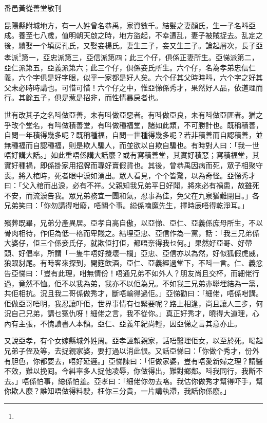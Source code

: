 \documentclass[a5paper, 12pt, openany]{book} %
\begin{document}
	番邑黃從善堂敬刊

	昆陽縣附城地方，有一人姓曾名恭禹，家資數千。結髮之妻顏氏，生一子名呌亞成。養至七八歲，值明朝天啟之時，地方盜起，不幸遭乱，妻子被賊捉去。乱定之後，續娶一个填房孔氏，又娶妾楊氏。妻生三子，妾又生三子。論起層次，長子亞孝派\footnote{}第一，亞忠派第三，亞信派第四；此三个仔，俱係正妻所生。亞悌派第二，亞仁派第五，亞義派第六；此三个仔，俱係妾氏所生。六个仔，名為孝弟忠信仁義，六个字俱是好字眼，似乎一家都是好人矣。六个仔其父時時呌，六个字之好其父未必時時講也。可惜可惜！六个仔之中，惟亞悌係秀才，果然好人品，依道理而行。其餘五子，俱是惹是招非，而性情暴戾者也。

	世有改其子之名呌做亞善，未有呌做亞惡者。有呌做亞良，未有呌做亞匪者。猶之乎改个堂名，有呌做積善堂，有呌做種福堂，諸如此類，不可勝計也。既稱積善，自問一年積得幾多呢？既稱種福，自問一世種得幾多呢？若非積善而自認積善，並無種福而自認種福，則是欺人騙人，而並欲以自欺自騙也。有時對人曰：「我一世唔好講大話。」如此重唔係講大話麼？或有寫積善堂，其實好積惡；寫積福堂，其實好種禍，即係掛家用招牌而專好賣假貨也。其後，曾恭禹因病而死，眾子相聚守喪。將入棺時，死者眼中淚如湧出。眾人看見，个个皆驚，以為奇怪。亞悌秀才曰：「父入棺而出淚，必有不祥。父親知我兄弟平日好鬦，將來必有禍患，故雖死不安，而流淚告我。眾兄弟務宜一團和氣，忍事為佳，免父在九泉猶難閉目。」各兄弟笑曰：「你勿講得咁廢，唔關个事。縂係喃魔先生，擇時辰唔得乾淨耳。」

	殯葬既畢，兄弟分產異居。亞孝自高自傲，以亞悌、亞仁、亞義係庶母所生，不以骨肉相待，作佢為低一格而卑賤之。結埋亞忠、亞信作為一黨，話：「我三兄弟係大婆仔，佢三个係妾氏仔，就欺佢打佢，都唔奈得我乜何。」果然好亞哥、好帶頭、好倡率，所謂「一隻牛唔好攪壞一欄」亞忠、亞信亦以為然，好似狐假虎威，狼跟豺尾。有時客來探到，開筵飲酒，亞仁、亞義經過堂下，不呌一言。仁、義忿告亞悌曰：「豈有此理，咁無情份！唔通兄弟不如外人？朋友尚且交杯，而細佬行過，竟然不恤。佢不以我為弟，我亦不以佢為兄。不如我三兄弟亦聯埋結為一黨，共佢相抗。況且我二哥係做秀才，斷唔輸得過佢。」亞悌勸曰：「細佬，唔係咁講。佢做亞哥唔明，我忍讓吓佢，世界事情有乜緊要呢？路上相逢，尚且讓人三步，何況自己兄弟，講乜冤仇呀！細佬之言，我不從你。」真正好秀才，曉得大道理，心內有主張，不愧讀書人本領。亞仁、亞義年紀尚輕，因亞悌之言其意亦止。

	又說亞孝，有个女嫁縣城外姓周。亞孝誣賴親家，話唔醫理佢女，以至於死。喝起兄弟子侄及等，去捉親家婆，要打過以消此恨。又話亞悌曰：「你做个秀才，份外有胆色，你都要去，唔好延遲。」亞悌諫曰：「佢做家婆，豈有唔愛新婦之理？請醫不效，難以挽囘。今糾率多人捉他凌辱，你做得出，難對鄉鄰。呌我同行，我斷不去。」唔係怕事，縂係怕羞。亞孝曰：「細佬你勿去咯。我估你做秀才幫得吓手，幫你欺人麼？誰知唔做得料駛，枉你三分貴，一片講執滯，我話你係廢。」
\end{document}
